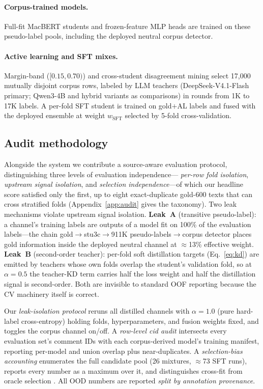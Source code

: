\paragraph{Corpus-trained models.} Full-fit MacBERT students and
frozen-feature MLP heads are trained on these pseudo-label pools,
including the deployed neutral corpus detector.

\paragraph{Active learning and SFT mixes.} Margin-band
($[0.15,0.70)$) and cross-student disagreement mining select 17{,}000
mutually disjoint corpus rows, labeled by LLM teachers (DeepSeek-V4.1-Flash
primary; Qwen3-4B and hybrid variants as comparisons) in rounds from
1K to 17K labels. A per-fold SFT student is trained on gold$+$AL
labels and fused with the deployed ensemble at weight $w_{\mathrm{SFT}}$
selected by 5-fold cross-validation.

\subsection{Audit methodology}
\label{sec:audit}

Alongside the system we contribute a source-aware evaluation
protocol, distinguishing three levels of evaluation independence---
\emph{per-row fold isolation}, \emph{upstream signal isolation}, and
\emph{selection independence}---of which our headline score satisfied
only the first, up to eight exact-duplicate gold-600 texts that can
cross stratified folds (Appendix~\ref{app:audit} gives the taxonomy).
Two leak mechanisms violate upstream signal isolation.
\textbf{Leak~A} (transitive pseudo-label): a channel's training labels
are outputs of a model fit on 100\% of the evaluation labels---the
chain gold$\to$stu3c$\to$911K pseudo-labels$\to$corpus detector places
gold information inside the deployed neutral channel at $\approx$13\%
effective weight. \textbf{Leak~B} (second-order teacher): per-fold
soft distillation targets (Eq.~\ref{eq:kd}) are emitted by teachers
whose own folds overlap the student's validation fold, so at
$\alpha{=}0.5$ the teacher-KD term carries half the loss weight and
half the distillation signal is second-order. Both are invisible to
standard OOF reporting because the CV machinery itself is correct.

Our \emph{leak-isolation protocol} reruns all distilled channels with
$\alpha{=}1.0$ (pure hard-label cross-entropy) holding folds,
hyperparameters, and fusion weights fixed, and toggles the corpus
channel on/off. A \emph{row-level cid audit} intersects every
evaluation set's comment IDs with each corpus-derived model's training
manifest, reporting per-model and union overlap plus near-duplicates.
A \emph{selection-bias accounting} enumerates the full candidate pool
(26 mixtures, $\approx$73 SFT runs), reports every number as a maximum
over it, and distinguishes cross-fit from oracle selection
\citep{dror2018hitchhiker}. All OOD numbers are reported \emph{split
by annotation provenance}.

